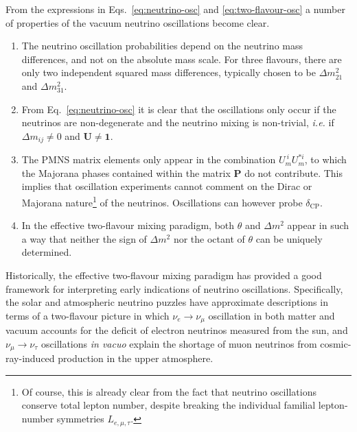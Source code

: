 From the expressions in Eqs.~\eqref{eq:neutrino-osc} and
\eqref{eq:two-flavour-osc} a number of properties of the vacuum neutrino
oscillations become clear.
\begin{enumerate}
  \item The neutrino oscillation probabilities depend on the neutrino mass
    differences, and not on the absolute mass scale. For three flavours, there
    are only two independent squared mass differences, typically chosen to be
    $\Delta m_{21}^{2}$ and $\Delta m_{31}^{2}$.
  \item From Eq.~\eqref{eq:neutrino-osc} it is clear that the oscillations only
    occur if the neutrinos are non-degenerate and the neutrino mixing is
    non-trivial, \textit{i.e.} if $\Delta m_{ij} \neq 0$ and
    $\mathbf{U} \neq \mathbf{1}$.
  \item The PMNS matrix elements only appear in the combination
    $U_{m}^{\ i} U_{m}^{* i}$, to which the Majorana phases contained within the
    matrix $\mathbf{P}$ do not contribute. This implies that oscillation
    experiments cannot comment on the Dirac or Majorana nature\footnote{Of
    course, this is already clear from the fact that neutrino oscillations
    conserve total lepton number, despite breaking the individual familial
    lepton-number symmetries $L_{e, \mu, \tau}$.} of the neutrinos. Oscillations
    can however probe $\delta_{\text{CP}}$.
  \item In the effective two-flavour mixing paradigm, both $\theta$ and
    $\Delta m^{2}$ appear in such a way that neither the sign of $\Delta m^{2}$
    nor the octant of $\theta$ can be uniquely determined.
  \end{enumerate}

  Historically, the effective two-flavour mixing paradigm has provided a good
  framework for interpreting early indications of neutrino oscillations.
  Specifically, the solar and atmospheric neutrino puzzles have approximate
  descriptions in terms of a two-flavour picture in which
  $\nu_{e} \to \nu_{\mu}$ oscillation in both matter and vacuum accounts for the
  deficit of electron neutrinos measured from the sun, and
  $\nu_{\mu} \to \nu_{\tau}$ oscillations \textit{in vacuo} explain the shortage
  of muon neutrinos from cosmic-ray-induced production in the upper atmosphere.


